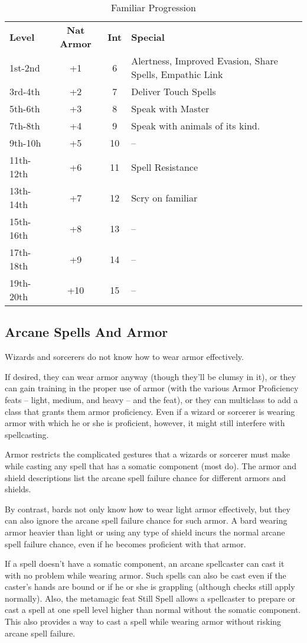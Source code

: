 \begin{table}[htb]
\caption{Familiar Progression}
\centering
\begin{tabular}{l c c l}
\textbf{Level} & \textbf{Nat Armor} & \textbf{Int} & \textbf{Special}\\
1st-2nd & +1 & 6 & Alertness, Improved Evasion, Share Spells, Empathic Link\\
3rd-4th & +2 & 7 & Deliver Touch Spells\\
5th-6th & +3 & 8 & Speak with Master\\
7th-8th & +4 & 9 & Speak with animals of its kind.\\
9th-10h & +5 & 10 & --\\
11th-12th & +6 & 11 & Spell Resistance\\
13th-14th & +7 & 12 & Scry on familiar\\
15th-16th & +8 & 13 & --\\
17th-18th & +9 & 14 & --\\
19th-20th & +10 & 15 & --\\
\end{tabular}
\end{table}

\subsection{Arcane Spells And Armor}

Wizards and sorcerers do not know how to wear armor effectively.

If desired, they can wear armor anyway (though they'll be clumsy in it), or they 
can gain training in the proper use of armor (with the various Armor Proficiency 
feats -- light, medium, and heavy -- and the  feat), or they can 
multiclass to add a class that grants them armor proficiency. Even if a wizard 
or sorcerer is wearing armor with which he or she is proficient, however, it might 
still interfere with spellcasting.

Armor restricts the complicated gestures that a wizards or sorcerer must make while 
casting any spell that has a somatic component (most do). The armor and shield 
descriptions list the arcane spell failure chance for different armors and shields.

By contrast, bards not only know how to wear light armor effectively, but they 
can also ignore the arcane spell failure chance for such armor. A bard wearing 
armor heavier than light or using any type of shield incurs the normal arcane spell 
failure chance, even if he becomes proficient with that armor.

If a spell doesn't have a somatic component, an arcane spellcaster can cast it 
with no problem while wearing armor. Such spells can also be cast even if the caster's 
hands are bound or if he or she is grappling (although  checks still 
apply normally). Also, the metamagic feat Still Spell allows a spellcaster to prepare 
or cast a spell at one spell level higher than normal without the somatic component. 
This also provides a way to cast a spell while wearing armor without risking arcane 
spell failure. 
